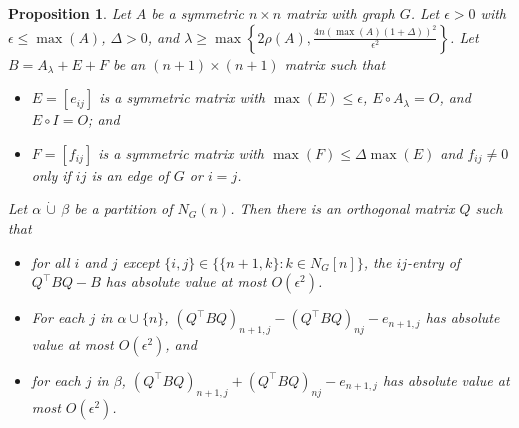 \documentclass[11pt]{article}
\newtheorem{prop}[thm]{Proposition}
\theoremstyle{definition}
\theoremstyle{definition}
\theoremstyle{definition}
\newcommand{\dcup}{\,\dot{\cup}\,}
\def\trans{^{\top}}
\begin{document}
\begin{prop}
\label{tech}
Let $A$ be a symmetric $n\times n$ matrix with graph $G$.   Let $\epsilon>0$ with $\epsilon\le\max(A)$, $\Delta>0$, and $\lambda \geq
  \max \left\{ 2\rho(A), \frac{4n (\max (A)(1+ \Delta))^2}{\epsilon^2} \right\}$.
Let $B= A_\lambda+ E + F$ be an $(n+1)\times (n+1)$ matrix  such that 
\begin{itemize} 
\item[(a)] $E=[e_{ij}]$ is a symmetric matrix with $\max (E) \leq \epsilon$, $E\circ A_\lambda=O$, and $E\circ I=O$; and 
\item[(b)] $F=[f_{ij}]$ is a symmetric matrix with $\max(F)\leq \Delta \max(E)$ and  $f_{ij} \neq 0$ only if $ij$ is an edge of $G$ or $i=j$. 
\end{itemize}
Let $\alpha \dcup \beta$ be a partition of $N_G(n)$. %
Then there is an orthogonal matrix $Q$ %
  such that 
\begin{itemize}
\item[(c)]
for all $i$ and $j$ except $\{i,j\} \in \{ \{n+1,k\}: k \in N_G[n] \}$, the $ij$-entry of $Q\trans BQ-B$ has absolute value at most $O( \epsilon^2)$.
\item[(d)] For each $j$ in $\alpha\cup\{n\}$,  $(Q\trans BQ)_{n+1,j}-(Q\trans BQ)_{nj}- e_{n+1,j} $ has absolute value at most $ O( \epsilon^2)$, and 
\item[(e)]
for each $j$ in $\beta$, $(Q\trans BQ)_{n+1,j}+(Q\trans BQ)_{nj} - e_{n+1,j} $ has absolute value at most $O( \epsilon^2)$.
\end{itemize}
\end{prop}
\end{document}
